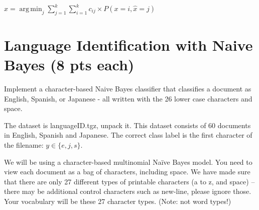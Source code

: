 \documentclass[a4paper]{article}
\theoremstyle{definition}
\DeclareMathOperator*{\argmin}{arg\,min}
\newenvironment{soln}{
    \leavevmode\color{blue}\ignorespaces
}{}
\begin{document}
\begin{soln}
$ \hat x = \argmin_j \sum_{j=1}^k\sum_{i=1}^k{ c_{ij}\times P(x = i,\hat x = j) }$
\end{soln}

\section{Language Identification with Naive Bayes (8 pts each)}
Implement a character-based Naive Bayes classifier that classifies a document as English, Spanish, or Japanese - all written with the 26 lower case characters and space.

The dataset is languageID.tgz, unpack it.
This dataset consists of 60 documents in English, Spanish and Japanese. 
The correct class label is the first character of the filename: $y \in \{e, j, s\}$.

We will be using a character-based multinomial Naïve Bayes model.  You need to view each document as a bag of characters, including space.  We have made sure that there are only 27 different types of printable characters (a to z, and space) -- there may be additional control characters such as new-line, please ignore those.  Your vocabulary will be these 27 character types. (Note: not word types!)
\end{document}
